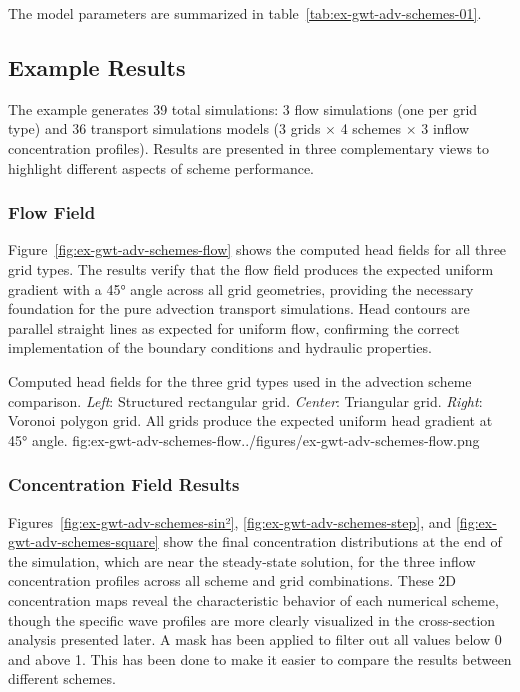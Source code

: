 The model parameters are summarized in table~\ref{tab:ex-gwt-adv-schemes-01}.



\subsection{Example Results}

The example generates 39 total simulations: 3 flow simulations (one per grid type) and 36 transport simulations models (3 grids $\times$ 4 schemes $\times$ 3 inflow concentration profiles). Results are presented in three complementary views to highlight different aspects of scheme performance.

\subsubsection{Flow Field}

Figure~\ref{fig:ex-gwt-adv-schemes-flow} shows the computed head fields for all three grid types. The results verify that the flow field produces the expected uniform gradient with a 45° angle across all grid geometries, providing the necessary foundation for the pure advection transport simulations. Head contours are parallel straight lines as expected for uniform flow, confirming the correct implementation of the boundary conditions and hydraulic properties.

\begin{StandardFigure}{
    Computed head fields for the three grid types used in the advection scheme comparison. \textit{Left}: Structured rectangular grid. \textit{Center}: Triangular grid. \textit{Right}: Voronoi polygon grid. All grids produce the expected uniform head gradient at 45° angle.
}{fig:ex-gwt-adv-schemes-flow}{../figures/ex-gwt-adv-schemes-flow.png}
\end{StandardFigure}

\subsubsection{Concentration Field Results}

Figures~\ref{fig:ex-gwt-adv-schemes-sin²}, \ref{fig:ex-gwt-adv-schemes-step}, and \ref{fig:ex-gwt-adv-schemes-square} show the final concentration distributions at the end of the simulation, which are near the steady-state solution, for the three inflow concentration profiles across all scheme and grid combinations. These 2D concentration maps reveal the characteristic behavior of each numerical scheme, though the specific wave profiles are more clearly visualized in the cross-section analysis presented later. A mask has been applied to filter out all values below 0 and above 1. This has been done to make it easier to compare the results between different schemes.

